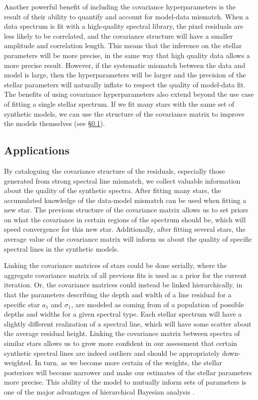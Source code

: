 \documentclass[iop,floatfix]{emulateapj}
\begin{document}
Another powerful benefit of including the covariance hyperparameters is the result of their ability to quantify and account for model-data mismatch. When a data spectrum is fit with a high-quality spectral library, the pixel residuals are less likely to be correlated, and the covariance structure will have a smaller amplitude and correlation length. This means that the inference on the stellar parameters will be more precise, in the same way that high quality data allows a more precise result. However, if the systematic mismatch between the data and model is large, then the hyperparameters will be larger and the precision of the stellar parameters will naturally inflate to respect the quality of model-data fit. The benefits of using covariance hyperparameters also extend beyond the use case of fitting a single stellar spectrum. If we fit many stars with the same set of synthetic models, we can use the structure of the covariance matrix to improve the models themselves (see \S\ref{subsec:learning}).


\subsection{Applications}
\label{subsec:learning}
By cataloguing the covariance structure of the residuals, especially those generated from strong spectral line mismatch, we collect valuable information about the quality of the synthetic spectra. After fitting many stars, the accumulated knowledge of the data-model mismatch can be used when fitting a new star. The previous structure of the covariance matrix allows us to set priors on what the covariance in certain regions of the spectrum should be, which will speed convergence for this new star. Additionally, after fitting several stars, the average value of the covariance matrix will inform us about the quality of specific spectral lines in the synthetic models. 

Linking the covariance matrices of stars could be done serially, where the aggregate covariance matrix of all previous fits is used as a prior for the current iteration. Or, the covariance matrices could instead be linked hierarchically, in that the parameters describing the depth and width of a line residual for a specific star $a_1$ and $\sigma_1$, are modeled as coming from of a population of possible depths and widths for a given spectral type. Each stellar spectrum will have a slightly different realization of a spectral line, which will have some scatter about the average residual height. Linking the covariance matrix between spectra of similar stars allows us to grow more confident in our assessment that certain synthetic spectral lines are indeed outliers and should be appropriately down-weighted. In turn, as we become more certain of the weights, the stellar posteriors will become narrower and make our estimates of the stellar parameters more precise. This ability of the model to mutually inform sets of parameters is one of the major advantages of hierarchical Bayesian analysis \citep{kruschke10}.
\end{document}
